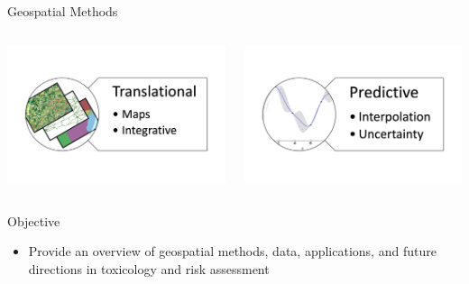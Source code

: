 \documentclass[
  ignorenonframetext,
]{beamer}
\providecommand{\tightlist}{%
  \setlength{\itemsep}{0pt}\setlength{\parskip}{0pt}}\usepackage{longtable,booktabs,array}
\begin{document}
\begin{frame}{Geospatial Methods}
\label{geospatial-methods}
\begin{columns}[T]
\begin{column}{0.5\textwidth}
\includegraphics{../../presentations/20240222_UNC_ESE_Guest_Lecture/maps-translational.png}
\end{column}

\begin{column}{0.5\textwidth}
\includegraphics{../../presentations/20240222_UNC_ESE_Guest_Lecture/geostats-predictive.png}
\end{column}
\end{columns}
\end{frame}

\begin{frame}{Objective}
\label{objective}
\begin{itemize}
\tightlist
\item
  Provide an overview of geospatial methods, data, applications, and
  future directions in toxicology and risk assessment
\end{itemize}
\end{frame}
\end{document}
